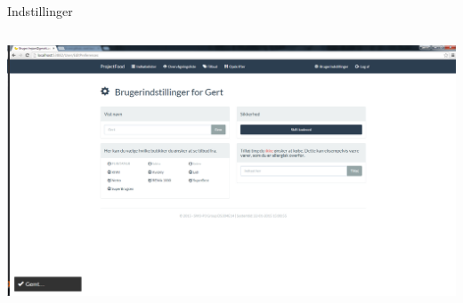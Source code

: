 \begin{frame}{Indstillinger}
\begin{minipage}[0.3\textheight]{\textwidth}
\begin{columns}[T]
\begin{column}{0.5\textwidth}
	 \vspace{2 mm}
	  
	  \includegraphics[width=1\textwidth,height=1\textheight,keepaspectratio, trim={1cm 0 0 16mm}, clip]{images/Screenshots/Settings.png}
	\end{column}
	\end{columns}
	

  \end{minipage}
	
\end{frame}

